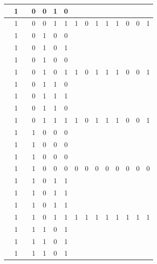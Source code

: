 \begin{table}[!tb]
\begin{tabular}{|c|c|c|c|c|c|c|c|c|c|c|c|c|c|c|}
        \rowcolor{yellow!40}  & 1 &  & 0 & 0 & 1 & 0 &  &  &  &  &  &  &  &  \\ \hline
        \rowcolor{yellow!40}  & 1 &  & 0 & 0 & 1 & 1 & 1 & 0 & 1 & 1 & 1 & 0 & 0 & 1 \\ \hline
        \rowcolor{gray!40}  & 1 &  & 0 & 1 & 0 & 0 &  &  &  &  &  &  &  &  \\ \hline
        \rowcolor{gray!40}  & 1 &  & 0 & 1 & 0 & 1 &  &  &  &  &  &  &  &  \\ \hline
        \rowcolor{gray!40}  & 1 &  & 0 & 1 & 0 & 0 &  &  &  &  &  &  &  &  \\ \hline
        \rowcolor{gray!40}  & 1 &  & 0 & 1 & 0 & 1 & 1 & 0 & 1 & 1 & 1 & 0 & 0 & 1 \\ \hline
        \rowcolor{blue!40}  & 1 &  & 0 & 1 & 1 & 0 &  &  &  &  &  &  &  &  \\ \hline
        \rowcolor{blue!40}  & 1 &  & 0 & 1 & 1 & 1 &  &  &  &  &  &  &  &  \\ \hline
        \rowcolor{blue!40}  & 1 &  & 0 & 1 & 1 & 0 &  &  &  &  &  &  &  &  \\ \hline
        \rowcolor{blue!40}  & 1 &  & 0 & 1 & 1 & 1 & 1 & 0 & 1 & 1 & 1 & 0 & 0 & 1 \\ \hline
        \rowcolor{red!40}  & 1 &  & 1 & 0 & 0 & 0 &  &  &  &  &  &  &  &  \\ \hline
        \rowcolor{red!40}  & 1 &  & 1 & 0 & 0 & 0 &  &  &  &  &  &  &  &  \\ \hline
        \rowcolor{red!40}  & 1 &  & 1 & 0 & 0 & 0 &  &  &  &  &  &  &  &  \\ \hline
        \rowcolor{red!40}  & 1 &  & 1 & 0 & 0 & 0 & 0 & 0 & 0 & 0 & 0 & 0 & 0 & 0 \\ \hline
        \rowcolor{green!40}  & 1 &  & 1 & 0 & 1 & 1 &  &  &  &  &  &  &  &  \\ \hline
        \rowcolor{green!40}  & 1 &  & 1 & 0 & 1 & 1 &  &  &  &  &  &  &  &  \\ \hline
        \rowcolor{green!40}  & 1 &  & 1 & 0 & 1 & 1 &  &  &  &  &  &  &  &  \\ \hline
        \rowcolor{green!40}  & 1 &  & 1 & 0 & 1 & 1 & 1 & 1 & 1 & 1 & 1 & 1 & 1 & 1 \\ \hline
        \rowcolor{yellow!40}  & 1 &  & 1 & 1 & 0 & 1 &  &  &  &  &  &  &  &  \\ \hline
        \rowcolor{yellow!40}  & 1 &  & 1 & 1 & 0 & 1 &  &  &  &  &  &  &  &  \\ \hline
        \rowcolor{yellow!40}  & 1 &  & 1 & 1 & 0 & 1 &  &  &  &  &  &  &  &  \\ \hline

\end{tabular}
\end{table}
